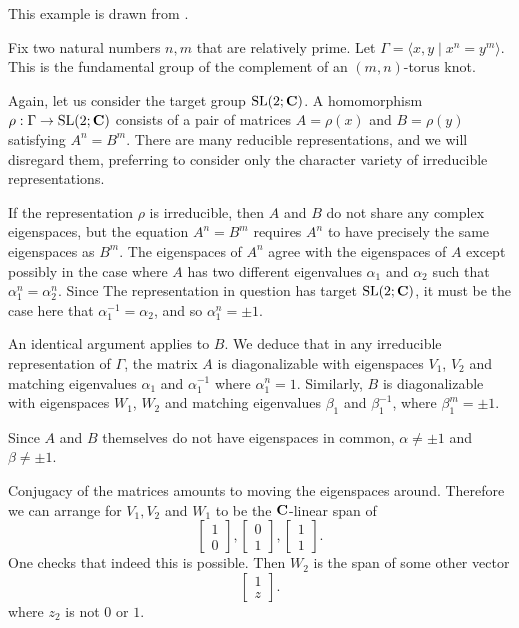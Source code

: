 \documentclass[11pt, oneside, usenames, dvipsnames, svgnames, table, draft]{amsart}
\begin{document}
\begin{example}
  This example is drawn from \cite{Munoz2009}.
  
  Fix two natural numbers $n,m$ that are relatively prime. Let $\Gamma = \langle x,y \mid x^n = y^m \rangle$. This is
  the fundamental group of the complement of an $(m,n)$-torus knot.

  Again, let us consider the target group $\operatorname{SL}(2; \mathbf{C})$. A homomorphism $\rho: \Gamma \to \operatorname{SL}(2; \mathbf{C})$ consists of a
  pair of matrices $A=\rho(x)$ and $B=\rho(y)$ satisfying $A^n = B^m$. There are many reducible representations, and we
  will disregard them, preferring to consider only the character variety of irreducible representations.


  If the representation $\rho$ is irreducible, then $A$ and $B$ do not share any complex eigenspaces, but the equation
  $A^n=B^m$ requires $A^n$ to have precisely the same eigenspaces as $B^m$. The eigenspaces of $A^n$ agree with the
  eigenspaces of $A$ except possibly in the case where $A$ has two different eigenvalues $\alpha_1$ and $\alpha_2$ such
  that $\alpha_1^n = \alpha_2^n$. Since The representation in question has target $\operatorname{SL}(2; \mathbf{C})$, it must be the case
  here that $\alpha_1^{-1} = \alpha_2$, and so $\alpha_1^n = \pm 1$.

  An identical argument applies to $B$. We deduce that in any irreducible representation of $\Gamma$, the matrix $A$ is
  diagonalizable with eigenspaces $V_1$, $V_2$ and matching eigenvalues $\alpha_1$ and $\alpha_1^{-1}$ where $\alpha_1^n
  = 1$. Similarly, $B$ is diagonalizable with eigenspaces $W_1$, $W_2$ and matching eigenvalues $\beta_1$ and
  $\beta_1^{-1}$, where $\beta_1^m = \pm 1$.

  Since $A$ and $B$ themselves do not have eigenspaces in common, $\alpha \neq \pm 1$ and $\beta \neq \pm 1$.

  Conjugacy of the matrices amounts to moving the eigenspaces around. Therefore we can arrange for $V_1, V_2$ and $W_1$
  to be the $\mathbf{C}$-linear span of
  \[
    \begin{bmatrix}
      1 \\ 0 
    \end{bmatrix},
    \begin{bmatrix}
      0 \\ 1 
    \end{bmatrix},
    \begin{bmatrix}
      1 \\ 1 
    \end{bmatrix}.
  \]
  One checks that indeed this is possible. Then $W_2$ is the span of some other vector
  \[
    \begin{bmatrix}
      1 \\ z
    \end{bmatrix}.
  \]
  where $z_2$ is not $0$ or $1$.


\end{example}
\end{document}
